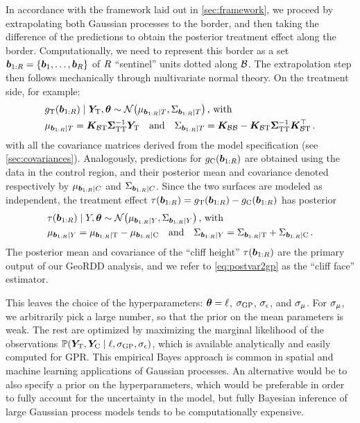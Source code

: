 \documentclass[12pt]{article}
\begin{document}
In accordance with the framework laid out in \autoref{sec:framework}, we proceed by extrapolating both Gaussian processes to the border,
and then taking the difference of the predictions to obtain the posterior treatment effect along the border.
Computationally, we need to represent this border as a set \(\bm{b}_{1:R}=\left\lbrace\bm{b}_1,\ldots,\bm{b}_R\right\rbrace\) of \(R\) ``sentinel'' units dotted along \(\mathcal{B}\).
The extrapolation step then follows mechanically through multivariate normal theory.
On the treatment side, for example:
\begin{equation}\begin{split}
    & g_\treat{}(\sentinels) \mid \yt{}, \hyperparam \sim \normal\del{\mu_{\sentinels \mid T}, \Sigma_{\sentinels \mid T}} \,\text{, with} \\
    & \mu_{\sentinels \mid T} =
    \KBT
    \STT^{-1} 
    \yt{} 
    \quad\text{and}\quad
    \Sigma_{\sentinels \mid T} =
    \KBB - \KBT \STT^{-1} \KBT\trans \,.
\end{split}
\label{eq:postvar2gp_t_or_c}
\end{equation}
with all the covariance matrices derived from the model specification (see \autoref{sec:covariances}).
Analogously, predictions for \(g_{\mathrm{C}}{}(\bm{b}_{1:R})\) are obtained using the data in the control region,
and their posterior mean and covariance denoted respectively by \(\mu_{\bm{b}_{1:R} \mid C}\) and \(\Sigma_{\bm{b}_{1:R} \mid C}\).
Since the two surfaces are modeled as independent, the treatment effect \(\tau(\bm{b}_{1:R})=g_{\mathrm{T}}{}(\bm{b}_{1:R})-g_{\mathrm{C}}{}(\bm{b}_{1:R})\) has posterior
\begin{equation}
    \begin{split}
        & \tau(\sentinels) \mid Y, \hyperparam \sim \normal\del{\mu_{\sentinels \mid Y}, \Sigma_{\sentinels \mid Y}} \,\text{, with}\\
        & \mu_{\sentinels \mid Y} = \mu_{\sentinels \mid \treat} - \mu_{\sentinels \mid \ctrol} \quad\text{and}\quad
        \Sigma_{\sentinels \mid Y} = \Sigma_{\sentinels \mid \treat} + \Sigma_{\sentinels \mid \ctrol} \,.
    \end{split}
    \label{eq:postvar2gp}
\end{equation}
The posterior mean and covariance of the ``cliff height'' \(\tau(\bm{b}_{1:R})\) are the primary output of our GeoRDD analysis, and we refer to \autoref{eq:postvar2gp} as the ``cliff face'' estimator.



This leaves the choice of the hyperparameters: \(\bm{\theta}=\ell\), \(\sigma_{\mathrm{GP}}\), \(\sigma_{\epsilon}\), and \(\sigma_{\mu}\).
For \(\sigma_{\mu}\), we arbitrarily pick a large number, so that the prior on the mean parameters is weak.
The rest are optimized by maximizing the marginal likelihood of the observations \(\Pr\del{\yt, \yc \mid \ell, \sigmaf, \sigman}\), which is available analytically and easily computed for GPR.
This empirical Bayes approach is common in spatial and machine learning applications of Gaussian processes.
An alternative would be to also specify a prior on the hyperparameters, which would be preferable in order to fully account for the uncertainty in the model, but fully Bayesian inference of large Gaussian process models tends to be computationally expensive.
\end{document}
